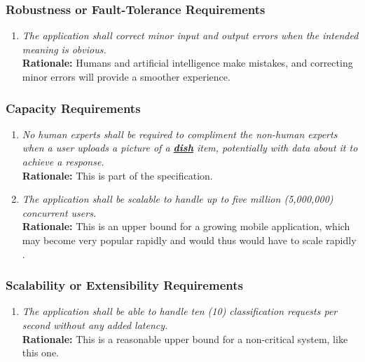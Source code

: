 \documentclass[]{article}
\begin{document}
\subsubsection{Robustness or Fault-Tolerance Requirements}
\label{ssub:robustness_or_fault_tolerance_requirements}
\begin{enumerate}[{PR-RFT}1. ]
	\item \textit{The application shall correct minor input and output errors when the intended meaning is obvious.} \\ \textbf{Rationale:} Humans and artificial intelligence make mistakes, and correcting minor errors will provide a smoother experience.
\end{enumerate}

\subsubsection{Capacity Requirements}
\label{ssub:capacity_requirements}
\begin{enumerate}[{PR-C}1. ]
	\item \textit{No human experts shall be required to compliment the non-human experts when a user uploads a picture of a \hyperref[Dish]{\textbf{dish}} item, potentially with data about it to achieve a response.} \\ \textbf{Rationale:} This is part of the specification.
	\item \textit{The application shall be scalable to handle up to five million (5,000,000) concurrent users.} \\ \textbf{Rationale:} This is an upper bound for a growing mobile application, which may become very popular rapidly and would thus would have to scale rapidly \cite{Zeba}.
\end{enumerate}

\subsubsection{Scalability or Extensibility Requirements}
\label{ssub:scalability_or_extensibility_requirements}
\begin{enumerate}[{PR-SE}1. ]
    \item \textit{The application shall be able to handle ten (10) classification requests per second without any added latency.} \\ \textbf{Rationale:} This is a reasonable upper bound for a non-critical system, like this one.
\end{enumerate}
\end{document}
